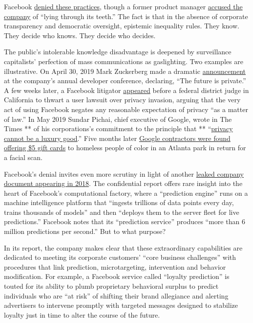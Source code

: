 Facebook
\href{https://about.fb.com/news/h/comments-on-research-and-ad-targeting/}{denied
these practices}, though a former product manager
\href{https://www.theguardian.com/technology/2017/may/02/facebook-executive-advertising-data-comment}{accused
the company} of ``lying through its teeth.'' The fact is that in the
absence of corporate transparency and democratic oversight, epistemic
inequality rules. They know. They decide who knows. They decide who
decides.

The public's intolerable knowledge disadvantage is deepened by
surveillance capitalists' perfection of mass communications as
gaslighting. Two examples are illustrative. On April 30, 2019 Mark
Zuckerberg made a dramatic
\href{https://www.theverge.com/2019/4/30/18524188/facebook-f8-keynote-mark-zuckerberg-privacy-future-2019}{announcement}
at the company's annual developer conference, declaring, ``The future is
private.'' A few weeks later, a Facebook litigator
\href{https://theintercept.com/2019/06/14/facebook-privacy-policy-court/}{appeared}
before a federal district judge in California to thwart a user lawsuit
over privacy invasion, arguing that the very act of using Facebook
negates any reasonable expectation of privacy ``as a matter of law.'' In
May 2019 Sundar Pichai, chief executive of Google, wrote in The Times **
of his corporations's commitment to the principle that **
``\href{https://www.nytimes.com/2019/05/07/opinion/google-sundar-pichai-privacy.html}{privacy
cannot be a luxury good}.'' Five months later
\href{https://www.nydailynews.com/news/national/ny-witness-saw-homeless-people-selling-face-scans-google-five-dollars-20191004-j6z2vonllnerpiuakt6wrp6l44-story.html}{Google
contractors were found offering \$5 gift cards} to homeless people of
color in an Atlanta park in return for a facial scan.

Facebook's denial invites even more scrutiny in light of another
\href{https://theintercept.com/2018/04/13/facebook-advertising-data-artificial-intelligence-ai/}{leaked
company document appearing in 2018}. The confidential report offers rare
insight into the heart of Facebook's computational factory, where a
``prediction engine'' runs on a machine intelligence platform that
``ingests trillions of data points every day, trains thousands of
models'' and then ``deploys them to the server fleet for live
predictions.'' Facebook notes that its ``prediction service'' produces
``more than 6 million predictions per second.'' But to what purpose?

In its report, the company makes clear that these extraordinary
capabilities are dedicated to meeting its corporate customers' ``core
business challenges'' with procedures that link prediction,
microtargeting, intervention and behavior modification. For example, a
Facebook service called ``loyalty prediction'' is touted for its ability
to plumb proprietary behavioral surplus to predict individuals who are
``at risk'' of shifting their brand allegiance and alerting advertisers
to intervene promptly with targeted messages designed to stabilize
loyalty just in time to alter the course of the future.

